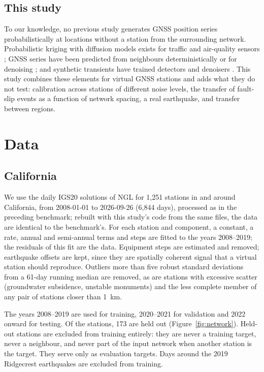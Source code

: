 \documentclass[preprint,12pt,authoryear]{elsarticle}
\begin{document}
\subsection{This study}

To our knowledge, no previous study generates GNSS position series probabilistically at
locations without a station from the surrounding network. Probabilistic kriging with
diffusion models exists for traffic and air-quality sensors \citep{hu2024ustd}; GNSS
series have been predicted from neighbours deterministically \citep{li2023interp} or for
denoising \citep{bachelot2025}; and synthetic transients have trained detectors and
denoisers \citep{costantino2023,costantino2024}. This study combines these elements for
virtual GNSS stations and adds what they do not test: calibration across stations of
different noise levels, the transfer of fault-slip events as a function of network
spacing, a real earthquake, and transfer between regions.

\section{Data}
\label{sec:data}

\subsection{California}

We use the daily IGS20 solutions of NGL for 1,251 stations in and around California, from
2008-01-01 to 2026-09-26 (6,844 days), processed as in the preceding benchmark; rebuilt
with this study's code from the same files, the data are identical to the benchmark's.
For each station and component, a constant, a rate, annual and semi-annual terms and
steps are fitted to the years 2008--2019; the residuals of this fit are the data.
Equipment steps are estimated and removed; earthquake offsets are kept, since they are
spatially coherent signal that a virtual station should reproduce. Outliers more than
five robust standard deviations from a 61-day running median are removed, as are stations
with excessive scatter (groundwater subsidence, unstable monuments) and the less complete
member of any pair of stations closer than 1~km.

The years 2008--2019 are used for training, 2020--2021 for validation and 2022 onward for
testing. Of the stations, 173 are held out (Figure~\ref{fig:network}). Held-out stations
are excluded from training entirely: they are never a training target, never a neighbour,
and never part of the input network when another station is the target. They serve only
as evaluation targets. Days around the 2019 Ridgecrest earthquakes are excluded from training.
\end{document}

